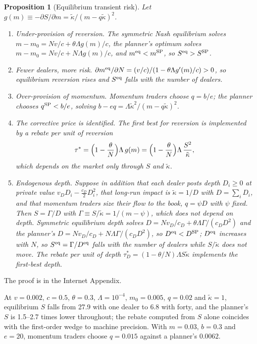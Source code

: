 \documentclass[12pt]{article}
\newtheorem{proposition}[theorem]{Proposition}
\theoremstyle{definition}
\theoremstyle{remark}
\begin{document}
\begin{proposition}[Equilibrium transient risk]\label{prop:equil}
Let $g(m)\equiv-\partial S/\partial m=\tilde\kappa/(m-q\tilde\kappa)^2$.
\begin{enumerate}[label=(\roman*)]
\item \emph{Under-provision of reversion.} The symmetric Nash equilibrium solves $m-m_0=N v/c+\theta\Lambda g(m)/c$, the planner's optimum solves $m-m_0=N v/c+N\Lambda g(m)/c$, and $m^{\rm eq}<m^{\rm SP}$, so $S^{\rm eq}>S^{\rm SP}$.
\item \emph{Fewer dealers, more risk.} $\partial m^{\rm eq}/\partial N=(v/c)/(1-\theta\Lambda g'(m)/c)>0$, so equilibrium reversion rises and $S^{\rm eq}$ falls with the number of dealers.
\item \emph{Over-provision of momentum.} Momentum traders choose $q=b/e$; the planner chooses $q^{\rm SP}<b/e$, solving $b-eq=\Lambda\tilde\kappa^2/(m-q\tilde\kappa)^2$.
\item \emph{The corrective price is identified.} The first best for reversion is implemented by a rebate per unit of reversion
\[
\tau^*=\Bigl(1-\frac\theta N\Bigr)\Lambda\,g(m)=\Bigl(1-\frac\theta N\Bigr)\Lambda\,\frac{S^2}{\tilde\kappa},
\]
which depends on the market only through $S$ and $\tilde\kappa$.
\item \emph{Endogenous depth.} Suppose in addition that each dealer posts depth $D_i\ge0$ at private value $v_DD_i-\tfrac{c_D}2D_i^2$, that long-run impact is $\tilde\kappa=1/D$ with $D=\sum_iD_i$, and that momentum traders size their flow to the book, $q=\psi D$ with $\psi$ fixed. Then $S=\Gamma/D$ with $\Gamma\equiv S/\tilde\kappa=1/(m-\psi)$, which does not depend on depth. Symmetric equilibrium depth solves $D=Nv_D/c_D+\theta\Lambda\Gamma/(c_DD^2)$ and the planner's $D=Nv_D/c_D+N\Lambda\Gamma/(c_DD^2)$, so $D^{\rm eq}<D^{\rm SP}$; $D^{\rm eq}$ increases with $N$, so $S^{\rm eq}=\Gamma/D^{\rm eq}$ falls with the number of dealers while $S/\tilde\kappa$ does not move. The rebate per unit of depth $\tau_D^*=(1-\theta/N)\Lambda S\tilde\kappa$ implements the first-best depth.
\end{enumerate}
\end{proposition}

The proof is in the Internet Appendix.


At $v=0.002$, $c=0.5$, $\theta=0.3$, $\Lambda=10^{-4}$, $m_0=0.005$, $q=0.02$ and $\tilde\kappa=1$, equilibrium $S$ falls from 27.9 with one dealer to 6.8 with forty, and the planner's $S$ is 1.5--2.7 times lower throughout; the rebate computed from $S$ alone coincides with the first-order wedge to machine precision. With $m=0.03$, $b=0.3$ and $e=20$, momentum traders choose $q=0.015$ against a planner's $0.0062$.
\end{document}
